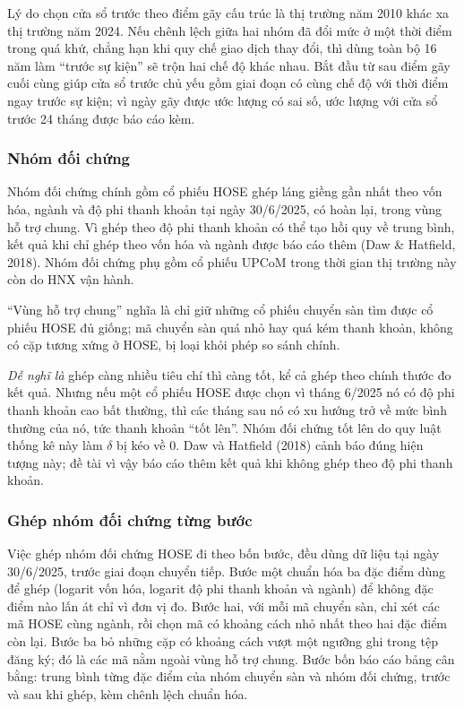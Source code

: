 Lý do chọn cửa sổ trước theo điểm gãy cấu trúc là thị trường năm 2010 khác xa thị trường năm 2024. Nếu chênh lệch giữa hai nhóm đã đổi mức ở một thời điểm trong quá khứ, chẳng hạn khi quy chế giao dịch thay đổi, thì dùng toàn bộ 16 năm làm \enquote{trước sự kiện} sẽ trộn hai chế độ khác nhau. Bắt đầu từ sau điểm gãy cuối cùng giúp cửa sổ trước chủ yếu gồm giai đoạn có cùng chế độ với thời điểm ngay trước sự kiện; vì ngày gãy được ước lượng có sai số, ước lượng với cửa sổ trước 24 tháng được báo cáo kèm.

\subsubsection*{Nhóm đối chứng}

Nhóm đối chứng chính gồm cổ phiếu HOSE ghép láng giềng gần nhất theo vốn hóa, ngành và độ phi thanh khoản tại ngày 30/6/2025, có hoàn lại, trong vùng hỗ trợ chung. Vì ghép theo độ phi thanh khoản có thể tạo hồi quy về trung bình, kết quả khi chỉ ghép theo vốn hóa và ngành được báo cáo thêm (Daw \& Hatfield, 2018). Nhóm đối chứng phụ gồm cổ phiếu UPCoM trong thời gian thị trường này còn do HNX vận hành.

\enquote{Vùng hỗ trợ chung} nghĩa là chỉ giữ những cổ phiếu chuyển sàn tìm được cổ phiếu HOSE đủ giống; mã chuyển sàn quá nhỏ hay quá kém thanh khoản, không có cặp tương xứng ở HOSE, bị loại khỏi phép so sánh chính.

\begin{delam}
\emph{Dễ nghĩ là} ghép càng nhiều tiêu chí thì càng tốt, kể cả ghép theo chính thước đo kết quả. Nhưng nếu một cổ phiếu HOSE được chọn vì tháng 6/2025 nó có độ phi thanh khoản cao bất thường, thì các tháng sau nó có xu hướng trở về mức bình thường của nó, tức thanh khoản \enquote{tốt lên}. Nhóm đối chứng tốt lên do quy luật thống kê này làm $\delta$ bị kéo về 0. Daw và Hatfield (2018) cảnh báo đúng hiện tượng này; đề tài vì vậy báo cáo thêm kết quả khi không ghép theo độ phi thanh khoản.
\end{delam}

\subsubsection*{Ghép nhóm đối chứng từng bước}

Việc ghép nhóm đối chứng HOSE đi theo bốn bước, đều dùng dữ liệu tại ngày 30/6/2025, trước giai đoạn chuyển tiếp. Bước một chuẩn hóa ba đặc điểm dùng để ghép (logarit vốn hóa, logarit độ phi thanh khoản và ngành) để không đặc điểm nào lấn át chỉ vì đơn vị đo. Bước hai, với mỗi mã chuyển sàn, chỉ xét các mã HOSE cùng ngành, rồi chọn mã có khoảng cách nhỏ nhất theo hai đặc điểm còn lại. Bước ba bỏ những cặp có khoảng cách vượt một ngưỡng ghi trong tệp đăng ký; đó là các mã nằm ngoài vùng hỗ trợ chung. Bước bốn báo cáo bảng cân bằng: trung bình từng đặc điểm của nhóm chuyển sàn và nhóm đối chứng, trước và sau khi ghép, kèm chênh lệch chuẩn hóa.

